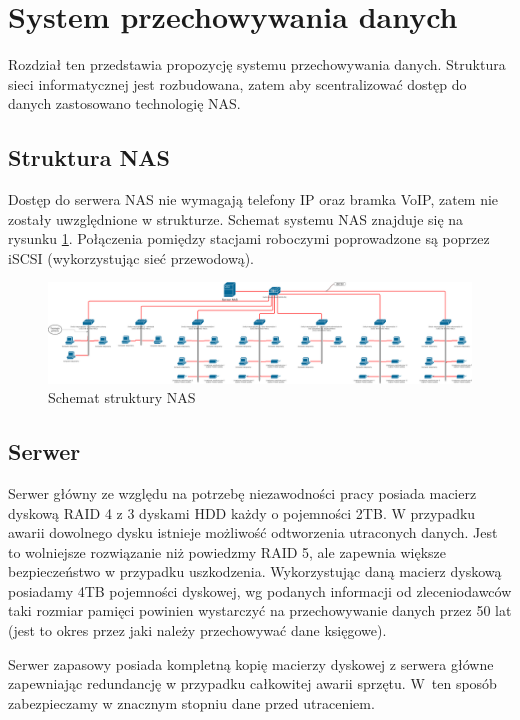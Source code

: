 \section{System przechowywania \newline danych}
Rozdział ten przedstawia propozycję systemu przechowywania danych. Struktura sieci informatycznej jest rozbudowana, zatem aby scentralizować dostęp do danych zastosowano technologię NAS. 

\subsection{Struktura NAS}
Dostęp do serwera NAS nie wymagają telefony IP oraz bramka VoIP, zatem nie zostały uwzględnione w strukturze. Schemat systemu NAS znajduje się na rysunku \ref{schemat:schemat_sieci_NAS}. Połączenia pomiędzy stacjami roboczymi poprowadzone są poprzez iSCSI (wykorzystując sieć przewodową).
\begin{landscape}
	\hspace{4cm}
	\begin{figure}[!h]
		\includegraphics[width=24cm]{Schemat_NAS.png}
		\caption{Schemat struktury NAS}
		\label{schemat:schemat_sieci_NAS}
	\end{figure}
\end{landscape}

\subsection{Serwer}
Serwer główny ze względu na potrzebę niezawodności pracy posiada macierz dyskową RAID 4 z 3 dyskami HDD każdy o pojemności 2TB. W przypadku awarii dowolnego dysku istnieje możliwość odtworzenia utraconych danych. Jest to wolniejsze rozwiązanie niż powiedzmy RAID 5, ale zapewnia większe bezpieczeństwo w przypadku uszkodzenia. Wykorzystując daną macierz dyskową posiadamy 4TB pojemności dyskowej, wg podanych informacji od zleceniodawców taki rozmiar pamięci powinien wystarczyć na przechowywanie danych przez 50 lat (jest to okres przez jaki należy przechowywać dane księgowe).

Serwer zapasowy posiada kompletną kopię macierzy dyskowej z serwera główne zapewniając redundancję w przypadku całkowitej awarii sprzętu. W~ten sposób zabezpieczamy w znacznym stopniu dane przed utraceniem.

